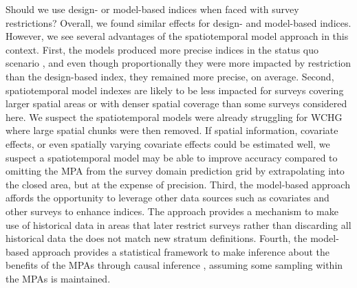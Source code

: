 \documentclass[12pt]{article}
\begin{document}
Should we use design- or model-based indices when faced with survey restrictions?
Overall, we found similar effects for design- and model-based indices.
However, we see several advantages of the spatiotemporal model approach in this context.
First, the models produced more precise indices in the status quo scenario \citep[sensu][]{thorson2015a}, and even though proportionally they were more impacted by restriction than the design-based index, they remained more precise, on average.
Second, spatiotemporal model indexes are likely to be less impacted for surveys covering larger spatial areas or with denser spatial coverage than some surveys considered here.
We suspect the spatiotemporal models were already struggling for WCHG where large spatial chunks were then removed.
If spatial information, covariate effects, or even spatially varying covariate effects \citep{hastie1993, barnett2021a, thorson2023svc} could be estimated well, we suspect a spatiotemporal model may be able to improve accuracy compared to omitting the MPA from the survey domain prediction grid by extrapolating into the closed area, but at the expense of precision.
Third, the model-based approach affords the opportunity to leverage other data sources such as covariates \citep{johnson2019} and other surveys \citep[e.g.,][]{gruss2019, webster2020, monnahan2021} to enhance indices.
The approach provides a mechanism to make use of historical data in areas that later restrict surveys rather than discarding all historical data the does not match new stratum definitions.
Fourth, the model-based approach provides a statistical framework to make inference about the benefits of the MPAs through causal inference \citep[e.g.,][]{pearl2016}, assuming some sampling within the MPAs is maintained.
\end{document}
